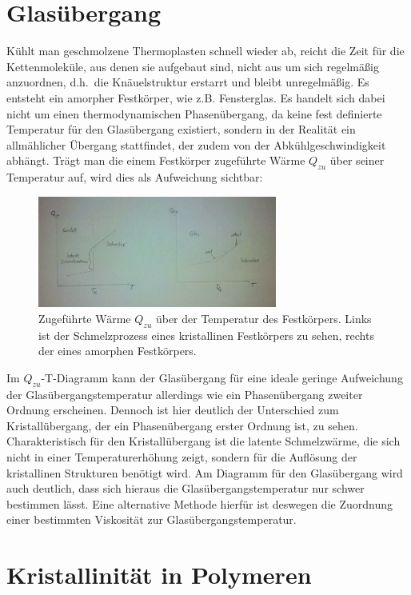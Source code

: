 \documentclass[bigchapter,colorback,accentcolor=tud4b,linedtoc,11pt]{tudreport}
\begin{document}
\section{Glasübergang}

Kühlt man geschmolzene Thermoplasten schnell wieder ab, reicht die Zeit für die Kettenmoleküle, aus denen sie aufgebaut sind, nicht aus um sich regelmäßig anzuordnen, d.h.\ die Knäuelstruktur erstarrt und bleibt unregelmäßig. Es entsteht ein amorpher Festkörper, wie z.B. Fensterglas. Es handelt sich dabei nicht um einen thermodynamischen Phasenübergang, da keine fest definierte Temperatur für den Glasübergang existiert, sondern in der Realität ein allmählicher Übergang stattfindet, der zudem von der Abkühlgeschwindigkeit abhängt. Trägt man die einem Festkörper zugeführte Wärme $Q_{zu}$ über seiner Temperatur auf, wird dies als Aufweichung sichtbar:


\begin{figure}[h] 
  \centering
     \includegraphics[width=0.7\textwidth]{data/glastemperatur.jpg}
  \caption{Zugeführte Wärme $Q_{zu}$ über der Temperatur des Festkörpers. Links ist der Schmelzprozess eines kristallinen Festkörpers zu sehen, rechts der eines amorphen Festkörpers.}
  \label{fig:Bild1}
\end{figure}

Im $Q_{zu}$-T-Diagramm kann der Glasübergang für eine ideale geringe Aufweichung der Glasübergangstemperatur allerdings wie ein Phasenübergang zweiter Ordnung erscheinen. Dennoch ist hier deutlich der Unterschied zum Kristallübergang, der ein Phasenübergang erster Ordnung ist, zu sehen. Charakteristisch für den Kristallübergang ist die latente Schmelzwärme, die sich nicht in einer Temperaturerhöhung zeigt, sondern für die Auflösung der kristallinen Strukturen benötigt wird. Am Diagramm für den Glasübergang wird auch deutlich, dass sich hieraus die Glasübergangstemperatur nur schwer bestimmen lässt. Eine alternative Methode hierfür ist deswegen die Zuordnung einer bestimmten Viskosität zur Glasübergangstemperatur.

\section{Kristallinität in Polymeren}
\end{document}
